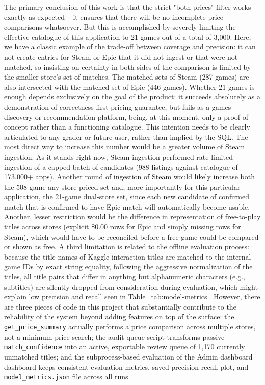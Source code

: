 \documentclass[fleqn,10pt]{wlscirep}
\begin{document}
The primary conclusion of this work is that the strict "both-prices" filter works exactly as expected – it ensures that there will be no incomplete price comparisons whatsoever. But this is accomplished by severely limiting the effective catalogue of this application to 21 games out of a total of 3,000. Here, we have a classic example of the trade-off between coverage and precision: it can not create entries for Steam or Epic that it did not ingest or that were not matched, so insisting on certainty in both sides of the comparison is limited by the smaller store's set of matches. The matched sets of Steam (287 games) are also intersected with the matched set of Epic (446 games). Whether 21 games is enough depends exclusively on the goal of the product: it succeeds absolutely as a demonstration of correctness-first pricing guarantee, but fails as a games-discovery or recommendation platform, being, at this moment, only a proof of concept rather than a functioning catalogue. This intention needs to be clearly articulated to any grader or future user, rather than implied by the SQL.
The most direct way to increase this number would be a greater volume of Steam ingestion. As it stands right now, Steam ingestion performed rate-limited ingestion of a capped batch of candidates (988 listings against catalogue of 173,000+ apps). Another round of ingestion of Steam would likely increase both the 508-game any-store-priced set and, more importantly for this particular application, the 21-game dual-store set, since each new candidate of confirmed match that is confirmed to have Epic match will automatically become usable.
Another, lesser restriction would be the difference in representation of free-to-play titles across stores (explicit \$0.00 rows for Epic and simply missing rows for Steam), which would have to be reconciled before a free game could be compared or shown as free.
A third limitation is related to the offline evaluation process: because the title names of Kaggle-interaction titles are matched to the internal game IDs by exact string equality, following the aggressive normalization of the titles, all title pairs that differ in anything but alphanumeric characters (e.g., subtitles) are silently dropped from consideration during evaluation, which might explain low precision and recall seen in Table~\ref{tab:model-metrics}.
However, there are three pieces of code in this project that substantially contribute to the reliability of the system beyond adding features on top of the surface: the \texttt{get\_price\_summary} actually performs a price comparison across multiple stores, not a minimum price search; the audit-queue script transforms passive \texttt{match\_confidence}  into an active, exportable review queue of 1,170 currently unmatched titles; and the subprocess-based evaluation of the Admin dashboard dashboard keeps consistent evaluation metrics, saved precision-recall plot, and \texttt{model\_metrics.json} file across all runs.
\end{document}
